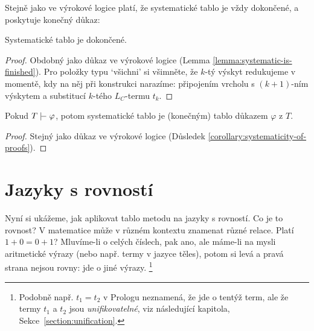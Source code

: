 Stejně jako ve výrokové logice platí, že systematické tablo je vždy dokončené, a poskytuje konečný důkaz:

\begin{lemma}\label{lemma:systematic-is-finished-predicate}
    Systematické tablo je dokončené.
\end{lemma}
\begin{proof}
    Obdobný jako důkaz ve výrokové logice (Lemma \ref{lemma:systematic-is-finished}). Pro položky typu `všichni' si všimněte, že $k$-tý výskyt redukujeme v momentě, kdy na něj při konstrukci narazíme: připojením vrcholu s $(k+1)$-ním výskytem a substitucí $k$-tého $L_C$-termu $t_k$.
\end{proof}

\begin{corollary}\label{corollary:systematicity-of-proofs-predicate}
    Pokud $T\proves\varphi$, potom systematické tablo je (konečným) tablo důkazem $\varphi$ z $T$.
\end{corollary}
\begin{proof}
    Stejný jako důkaz ve výrokové logice (Důsledek \ref{corollary:systematicity-of-proofs}).
\end{proof}


\section{Jazyky s rovností} \label{section:tableaux-equality}

Nyní si ukážeme, jak aplikovat tablo metodu na jazyky s rovností. Co je to rovnost? V matematice může v různém kontextu znamenat různé relace. Platí $1+0=0+1$? Mluvíme-li o celých číslech, pak ano, ale máme-li na mysli aritmetické výrazy (nebo např. termy v jazyce těles), potom si levá a pravá strana nejsou rovny: jde o jiné výrazy. \footnote{Podobně např. $t_1=t_2$ v Prologu neznamená, že jde o tentýž term, ale že termy $t_1$ a $t_2$ jsou \emph{unifikovatelné}, viz následující kapitola, Sekce~\ref{section:unification}.}

